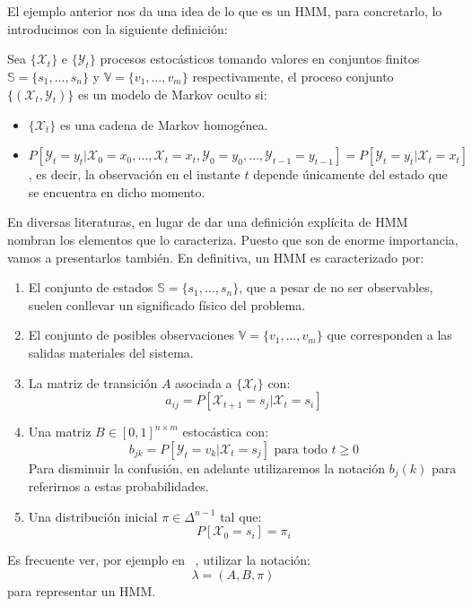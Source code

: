 El ejemplo anterior nos da una idea de lo que es un HMM, para concretarlo, lo introducimos con la siguiente definición:
\begin{definition}
    Sea $\{\mathcal{X}_t\}$ e $\{\mathcal{Y}_t\}$ procesos estocásticos tomando valores en conjuntos finitos $\mathbb{S}=\{s_1,\dots ,s_n\}$ y $\mathbb{V}=\{v_1,\dots ,v_m\}$ respectivamente, el proceso conjunto $\{\left(\mathcal{X}_t,\mathcal{Y}_t\right)\}$ es un modelo de Markov oculto si:
    \begin{itemize}
        \item $\{\mathcal{X}_t\}$ es una cadena de Markov homogénea. 
        \item $P[\mathcal{Y}_t=y_t|\mathcal{X}_0=x_0,\dots,\mathcal{X}_t=x_t,\mathcal{Y}_0=y_0,\dots,\mathcal{Y}_{t-1}=y_{t-1}]=P[\mathcal{Y}_t=y_t|\mathcal{X}_t=x_t]$, es decir, la observación en el instante $t$ depende únicamente del estado que se encuentra en dicho momento.
    \end{itemize}

\end{definition}

En diversas literaturas, en lugar de dar una definición explícita de HMM nombran los elementos que lo caracteriza. Puesto que son de enorme importancia, vamos a presentarlos también. En definitiva, un HMM es caracterizado por:
\begin{enumerate}
    \item El conjunto de estados $\mathbb{S}=\{s_1,\dots ,s_n\}$, que a pesar de no ser observables, suelen conllevar un significado físico del problema.
    \item El conjunto de posibles observaciones $\mathbb{V}=\{v_1,\dots ,v_m\}$ que corresponden a las salidas materiales del sistema.
    \item La matriz de transición $A$ asociada a $\{\mathcal{X}_t\}$ con:
    \[a_{ij} = P[\mathcal{X}_{t+1}=s_j|\mathcal{X}_t=s_i]\]
    \item Una matriz $B\in\left[0,1\right]^{n\times m}$ estocástica con:
    \[b_{jk} = P[\mathcal{Y}_{t}=v_k|\mathcal{X}_t=s_j] \text{ para todo $t\geq0$}\]
    Para disminuir la confusión, en adelante utilizaremos la notación $b_{j}(k)$ para referirnos a estas probabilidades.
    \item Una distribución inicial $\pi\in\Delta^{n-1}$ tal que:
    \[P[\mathcal{X}_{0}=s_i]=\pi_i\]
\end{enumerate}

Es frecuente ver, por ejemplo en ~\cite{Rabiner}, utilizar la notación:
\[\lambda=\left(A,B,\pi\right)\]
para representar un HMM.

